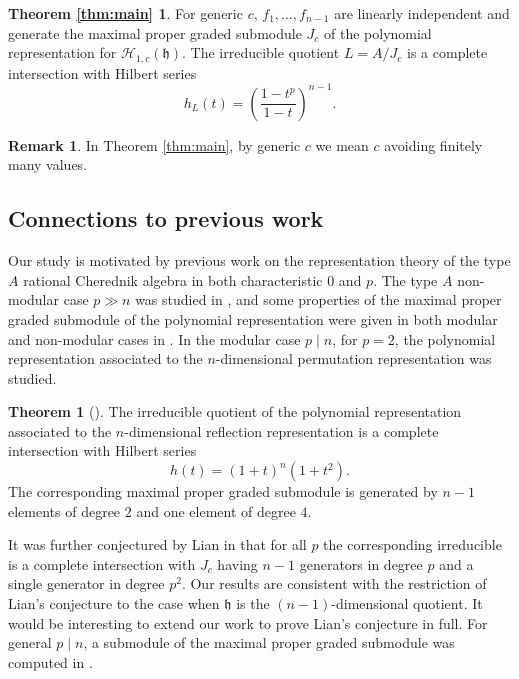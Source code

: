 \documentclass{amsart}
\numberwithin{equation}{section}
\theoremstyle{definition}
\newtheorem{theorem}{Theorem}[section]
\newtheorem*{remark}{Remark}
\newcommand{\h}{\mathfrak{h}}
\newcommand{\HH}{\mathcal{H}}
\begin{document}
\newtheorem*{thm:main}{Theorem \ref{thm:main}} \begin{thm:main}
For generic $c$, $f_1, \ldots, f_{n-1}$ are linearly independent and generate the maximal proper graded submodule $J_c$ of the polynomial representation for $\HH_{1, c}(\h)$.  The irreducible quotient $L = A/J_c$ is a complete intersection with Hilbert series 
\[
h_L(t) = \left(\frac{1-t^p}{1-t}\right)^{n-1}.
\]
\end{thm:main}
\begin{remark}
In Theorem \ref{thm:main}, by generic $c$ we mean $c$ avoiding finitely many values.
\end{remark}

\subsection{Connections to previous work}

Our study is motivated by previous work on the representation theory of the type $A$ rational Cherednik algebra in both characteristic $0$ and $p$.  The type $A$ non-modular case $p \gg n$ was studied in \cite{BFG}, and some properties of the maximal proper graded submodule of the polynomial representation were given in both modular and non-modular cases in \cite{BC1}.  In the modular case $p \mid n$, for $p = 2$, the polynomial representation associated to the $n$-dimensional permutation representation was studied.
\begin{theorem}[{\cite[Theorem 5.1]{L}}] \label{thm:lian}
The irreducible quotient of the polynomial representation associated to the $n$-dimensional reflection representation is a complete intersection with Hilbert series
\[
h(t) = (1 + t)^n (1 + t^2).
\]
The corresponding maximal proper graded submodule is generated by $n - 1$ elements of degree $2$ and one element of degree $4$. 
\end{theorem} 
It was further conjectured by Lian in \cite[Conjecture 5.2]{L} that for all $p$ the corresponding irreducible is a complete intersection with $J_c$ having $n - 1$ generators in degree $p$ and a single generator in degree $p^2$.  Our results are consistent with the restriction of Lian's conjecture to the case when $\h$ is the $(n - 1)$-dimensional quotient.  It would be interesting to extend our work to prove Lian's conjecture in full.  For general $p \mid n$, a submodule of the maximal proper graded submodule was computed in \cite[Proposition 6.1]{DS}.
\end{document}
